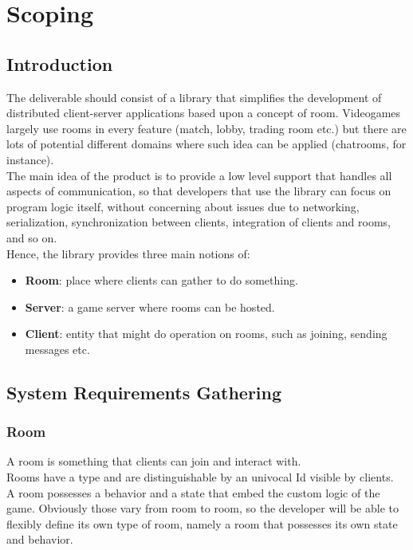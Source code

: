 \chapter{Scoping}

\section{Introduction}

The deliverable should consist of a library that simplifies the development of distributed client-server applications based upon a concept of room. Videogames largely use rooms in every feature (match, lobby, trading room etc.) but there are lots of potential different domains where such idea can be applied (chatrooms, for instance).
\\
The main idea of the product is to provide a low level support that handles all aspects of communication, so that developers that use the library can focus on program logic itself, without concerning about issues due to networking, serialization, synchronization between clients, integration of clients and rooms, and so on.
\\
Hence, the library provides three main notions of:
\begin{itemize}
\item \textbf{Room}: place where clients can gather to do something.
\item \textbf{Server}: a game server where rooms can be hosted.
\item \textbf{Client}: entity that might do operation on rooms, such as joining, sending messages etc.
\end{itemize} 

\section{System Requirements Gathering}

\subsection{Room}

A room is something that clients can join and interact with.
\\
Rooms have a type and are distinguishable by an univocal Id visible by clients.
\\
A room possesses a behavior and a state that embed the custom logic of the game. Obviously those vary from room to room, so the developer will be able to flexibly define its own type of room, namely a room that possesses its own state and behavior.

